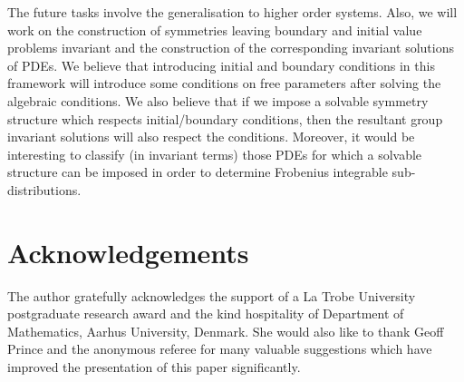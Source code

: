 \documentclass[a4paper, 11pt]{amsart}
\theoremstyle{definition}
\begin{document}
 The future tasks involve the generalisation to higher order systems. Also, we will work on the construction of symmetries leaving boundary and initial value problems invariant and the construction of the corresponding invariant solutions of PDEs. We believe that introducing initial and boundary conditions in this framework will introduce some conditions on free parameters after solving the algebraic conditions. We also believe that if we impose a solvable symmetry structure which respects initial/boundary conditions, then the resultant group invariant solutions will also respect the conditions. Moreover, it would be interesting to classify (in invariant terms) those PDEs for which a solvable structure can be imposed in order to determine Frobenius integrable sub-distributions.
\section*{Acknowledgements}
The author gratefully acknowledges the support of a La Trobe University  postgraduate research award and the kind hospitality of Department of Mathematics, Aarhus University, Denmark. She would also like to thank Geoff Prince and the anonymous referee for  many valuable suggestions which have improved the presentation of this paper significantly.
\end{document}
